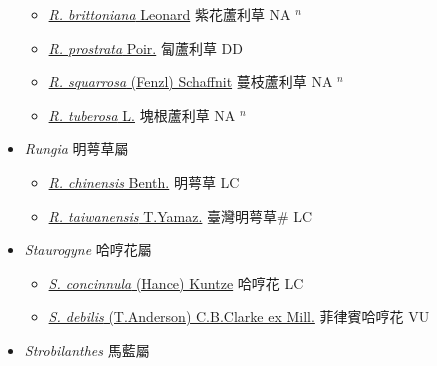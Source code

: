 \begin{itemize}
  \begin{itemize}
        \item[] \href{http://www.theplantlist.org/tpl1.1/search?q=Ruellia+brittoniana}{\textit{R. brittoniana} Leonard}   紫花蘆利草 NA $^n$
        \item[] \href{http://www.theplantlist.org/tpl1.1/search?q=Ruellia+prostrata}{\textit{R. prostrata} Poir.}   匐蘆利草 DD
        \item[] \href{http://www.theplantlist.org/tpl1.1/search?q=Ruellia+squarrosa}{\textit{R. squarrosa} (Fenzl) Schaffnit}   蔓枝蘆利草 NA $^n$
        \item[] \href{http://www.theplantlist.org/tpl1.1/search?q=Ruellia+tuberosa}{\textit{R. tuberosa} L.}   塊根蘆利草 NA $^n$
  \end{itemize}
 \item[] \textit{Rungia} 明萼草屬
                    
  \begin{itemize}
        \item[] \href{http://www.theplantlist.org/tpl1.1/search?q=Rungia+chinensis}{\textit{R. chinensis} Benth.}   明萼草 LC
        \item[] \href{http://www.theplantlist.org/tpl1.1/search?q=Rungia+taiwanensis}{\textit{R. taiwanensis} T.Yamaz.}   臺灣明萼草\# LC
  \end{itemize}
 \item[] \textit{Staurogyne} 哈哼花屬
                    
  \begin{itemize}
        \item[] \href{http://www.theplantlist.org/tpl1.1/search?q=Staurogyne+concinnula}{\textit{S. concinnula} (Hance) Kuntze}   哈哼花 LC
        \item[] \href{http://www.theplantlist.org/tpl1.1/search?q=Staurogyne+debilis}{\textit{S. debilis} (T.Anderson) C.B.Clarke ex Mill.}   菲律賓哈哼花 VU
  \end{itemize}
 \item[] \textit{Strobilanthes} 馬藍屬
                    

\end{itemize}
